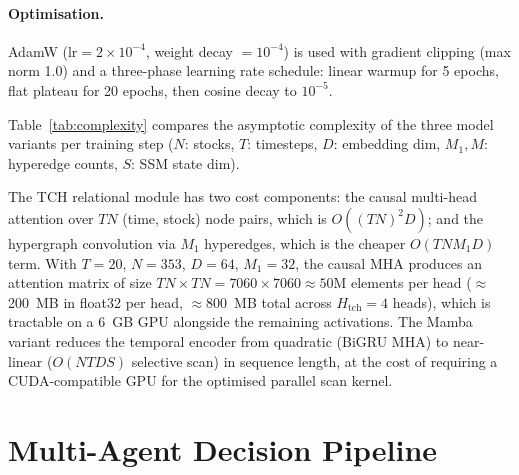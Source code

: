\documentclass[a4paper,11pt]{report}
\begin{document}
\paragraph{Optimisation.}
AdamW ($\text{lr}=2\times10^{-4}$, weight decay $=10^{-4}$) is used with gradient clipping (max norm 1.0) and a three-phase learning rate schedule: linear warmup for 5 epochs, flat plateau for 20 epochs, then cosine decay to $10^{-5}$.

Table~\ref{tab:complexity} compares the asymptotic complexity of the three model variants per training step ($N$: stocks, $T$: timesteps, $D$: embedding dim, $M_1,M$: hyperedge counts, $S$: SSM state dim).

\begin{table}[htbp]
\centering
\small
\caption{Asymptotic time complexity per training step for each model variant.}
\label{tab:complexity}
\end{table}

The TCH relational module has two cost components: the causal multi-head attention over $TN$ (time, stock) node pairs, which is $O((TN)^2D)$; and the hypergraph convolution via $M_1$ hyperedges, which is the cheaper $O(TNM_1D)$ term. With $T=20$, $N=353$, $D=64$, $M_1=32$, the causal MHA produces an attention matrix of size $TN \times TN = 7060 \times 7060 \approx 50$M elements per head ($\approx$200~MB in float32 per head, $\approx$800~MB total across $H_{\text{tch}}{=}4$ heads), which is tractable on a 6~GB GPU alongside the remaining activations. The Mamba variant reduces the temporal encoder from quadratic (BiGRU MHA) to near-linear ($O(NTDS)$ selective scan) in sequence length, at the cost of requiring a CUDA-compatible GPU for the optimised parallel scan kernel.

\section{Multi-Agent Decision Pipeline}
\label{sec:multiagent}
\end{document}
